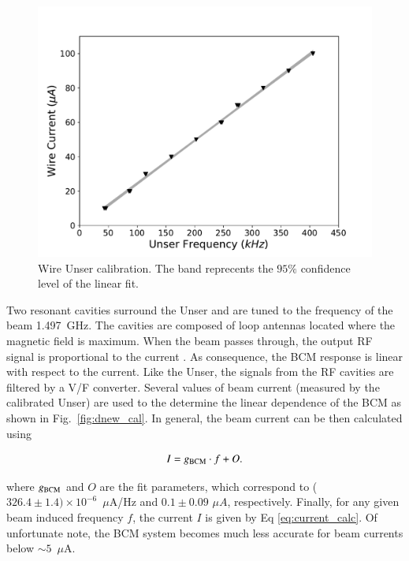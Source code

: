 \documentclass[review,numbers,sort&compress]{elsarticle}
\begin{document}
\begin{figure}[!h]
    \centering
    \includegraphics[width=\linewidth]{images/unser_calibration.pdf}
    \caption{Wire Unser calibration. The band reprecents the $95\%$ confidence level of the linear fit.}
    \label{fig:unser_cal}
\end{figure}
  
Two resonant cavities surround the Unser and are tuned to the frequency of the beam 1.497~GHz.
The cavities are composed of loop antennas located where the magnetic field is maximum. 
When the beam passes through, the output RF signal is proportional to the current \cite{Denard:2001zg}. 
As consequence, the BCM response is linear with respect to the current. Like the Unser, the signals 
from the RF cavities are filtered by a V/F converter. Several values of beam current (measured by the 
calibrated Unser) are used to the determine the linear dependence of the BCM as shown in 
Fig.~\ref{fig:dnew_cal}.  In general, the beam current can be then calculated using

\begin{equation}
I = g_{\rm{BCM}}\cdot f+O.
\label{eq:current_calc}
\end{equation}

\noindent where $g_{\rm{BCM}}$ and $O$ are the fit parameters, which correspond 
to ($326.4 \pm 1.4) \times 10^{-6}$~$\mu$A/Hz 
and $0.1 \pm 0.09$  $\mu A$, respectively. Finally, for any given beam induced frequency $f$, the 
current $I$ is given by Eq \ref{eq:current_calc}. Of unfortunate note, the BCM system becomes much 
less accurate for beam currents below $\sim 5$~$\mu$A.
  
\end{document}
